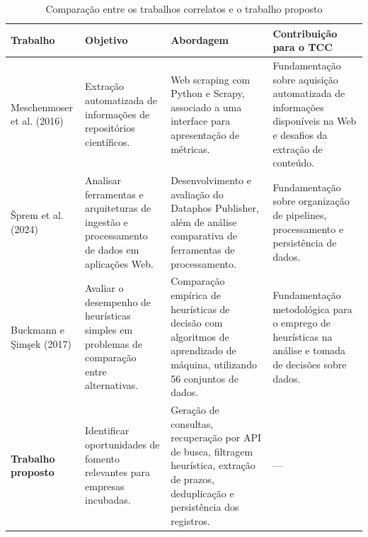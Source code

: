  \begin{table}[ht]
    \centering
    \caption{Comparação entre os trabalhos correlatos e o trabalho proposto}
    \label{tab:trabalhos_correlatos}
    \small
    \begin{tabularx}{\textwidth}{
        >{\raggedright\arraybackslash}p{2.8cm}
        >{\raggedright\arraybackslash}X
        >{\raggedright\arraybackslash}X
        >{\raggedright\arraybackslash}X
    }
        \toprule
        \textbf{Trabalho} &
        \textbf{Objetivo} &
        \textbf{Abordagem} &
        \textbf{Contribuição para o TCC} \\
        \midrule

        Meschenmoser et al. (2016) &
        Extração automatizada de informações de repositórios científicos. &
        Web scraping com Python e Scrapy, associado a uma interface para apresentação de métricas. &
        Fundamentação sobre aquisição automatizada de informações disponíveis na Web e desafios da extração de conteúdo. \\

        \midrule

        Šprem et al. (2024) &
        Analisar ferramentas e arquiteturas de ingestão e processamento de dados em aplicações Web. &
        Desenvolvimento e avaliação do Dataphos Publisher, além de análise comparativa de ferramentas de processamento. &
        Fundamentação sobre organização de pipelines, processamento e persistência de dados. \\

        \midrule

        Buckmann e Şimşek (2017) &
        Avaliar o desempenho de heurísticas simples em problemas de comparação entre alternativas. &
        Comparação empírica de heurísticas de decisão com algoritmos de aprendizado de máquina, utilizando 56 conjuntos de dados. &
        Fundamentação metodológica para o emprego de heurísticas na análise e tomada de decisões sobre dados. \\

        \midrule

        \textbf{Trabalho proposto} &
        Identificar oportunidades de fomento relevantes para empresas incubadas. &
        Geração de consultas, recuperação por API de busca, filtragem heurística, extração de prazos, deduplicação e persistência dos registros. &
        --- \\

        \bottomrule
    \end{tabularx}
\end{table}

